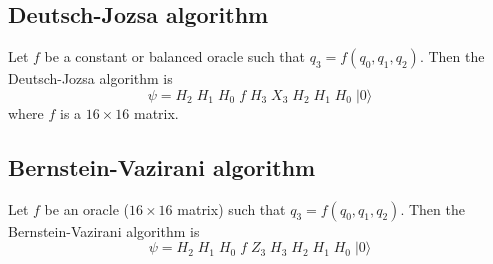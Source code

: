 \documentclass[12pt]{article}
\begin{document}
\subsection*{Deutsch-Jozsa algorithm}
Let $f$ be a constant or balanced oracle such that $q_3=f(q_0,q_1,q_2)$.
Then the Deutsch-Jozsa algorithm is
\begin{equation*}
\psi = H_2 \; H_1 \; H_0 \; f \; H_3 \; X_3 \; H_2 \; H_1 \; H_0 \; |0\rangle
\end{equation*}
where $f$ is a $16\times16$ matrix.

\subsection*{Bernstein-Vazirani algorithm}
Let $f$ be an oracle ($16\times16$ matrix) such that $q_3=f(q_0,q_1,q_2)$.
Then the Bernstein-Vazirani algorithm is
\begin{equation*}
\psi = H_2 \; H_1 \; H_0 \; f \; Z_3 \; H_3 \; H_2 \; H_1 \; H_0 \; |0\rangle
\end{equation*}
\end{document}

